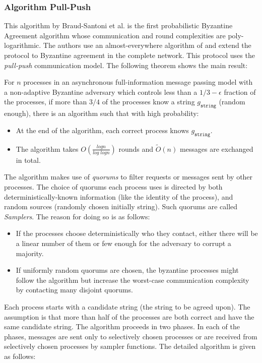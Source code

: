 \subsubsection{Algorithm Pull-Push \cite{BGH13}}
This algorithm by Braud-Santoni et al. \cite{BGH13} is the first probabilistic Byzantine Agreement algorithm whose communication and round complexities are poly-logarithmic. The authors use an almost-everywhere algorithm of \cite{KSSV06} and extend the protocol to Byzantine agreement in the complete network. This protocol uses the \textit{pull-push} communication model. The following theorem shows the main result: 


\begin{theorem}
For $n$ processes in an asynchronous full-information message passing model with a non-adaptive Byzantine adversary which controls less than a $1/3 - \epsilon$ fraction of the processes, if more than $3/4$ of the processes know a string $g_{\mathtt{string}}$ (random enough), there is an algorithm such that with high probability:
\begin{itemize}
\item At the end of the algorithm, each correct process knows $g_{\mathtt{string}}$.
\item The algorithm takes $O(\frac{logn}{log \; logn})$ rounds and $\tilde{O}(n)$ messages are exchanged in total. 
\end{itemize}
\end{theorem}

The algorithm makes use of \textit{quorums} to filter requests or messages sent by other processes. The choice of quorums each process uses is directed by both deterministically-known information (like the identity of the process), and random sources (randomly chosen initially string). Such quorums are called \textit{Samplers}. The reason for doing so is as follows:
\begin{itemize}
\item If the processes choose deterministically who they contact, either there will be a linear number of them or few enough for the adversary to corrupt a majority. 
\item If uniformly random quorums are chosen, the byzantine processes might follow the algorithm but increase the worst-case communication complexity by contacting many disjoint quorums. 
\end{itemize}

Each process starts with a candidate string (the string to be agreed upon). The assumption is that more than half of the processes are both correct and have the same candidate string. The algorithm proceeds in two phases. In each of the phases, messages are sent only to selectively chosen processes or are received from selectively chosen processes by sampler functions. The detailed algorithm is given as follows:

